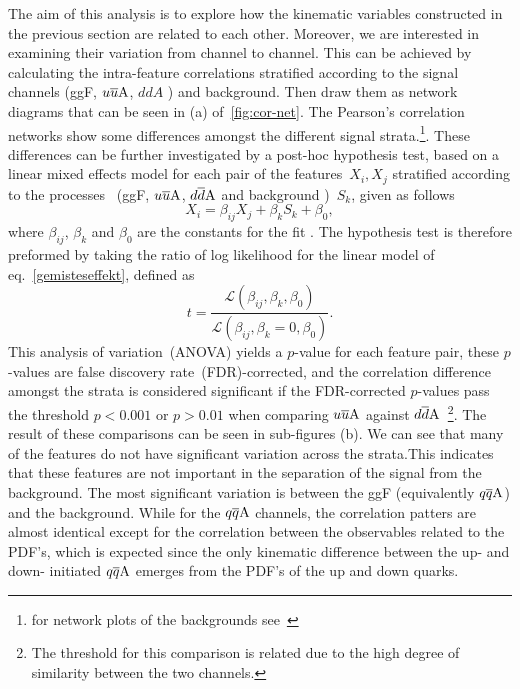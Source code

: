 The aim of this analysis is to explore how the kinematic variables constructed in the previous section are related to each other. Moreover, we are interested in examining their variation from channel to channel.  This can be achieved by calculating the intra-feature correlations stratified according to the signal channels (ggF, $u\overline u \rm A$, $ddA$ ) and background. Then draw them as network diagrams that can be seen in (a) of~\autoref{fig:cor-net}. The Pearson's correlation networks show some differences amongst the different signal strata.\footnote{for network plots of the backgrounds see~\cite{Grojean:2020ech}}. These differences can be further investigated by a post-hoc hypothesis test, based on a linear mixed effects model for each pair of the features~$X_i, X_j$ stratified according to the processes ~(ggF, $u\overline u \rm A$, $d\overline d \rm A$ and background )~$S_k$, given as follows
\begin{equation}
X_i = \beta_{ij} X_j + \beta_k S_k + \beta_0,
\label{gemisteseffekt}
\end{equation}
where $\beta_{ij}$, $\beta_k$ and $\beta_0$ are the constants for the fit . The hypothesis test is therefore preformed by taking  the ratio of log likelihood for the linear model of eq.~\eqref{gemisteseffekt}, defined as
\begin{equation}
	t = \frac{\mathscr{L} (\beta_{ij},\beta_k,\beta_0) }{\mathscr{L}(\beta_{ij},\beta_k=0,\beta_0)}.
\end{equation}
This analysis of variation~(ANOVA) yields a $p$-value for each feature pair, these $p$-values are false discovery rate~(FDR)-corrected, and the correlation difference amongst the strata is considered significant if the FDR-corrected $p$-values pass the threshold $ p<0.001$ or $p>0.01$ when comparing $u\overline u \rm A$ against $d\overline d \rm A$~\footnote{The threshold for this comparison is related due to the high degree of similarity between the two channels.}. The result of these comparisons can be seen in sub-figures (b). We can see that many of the features do not have significant variation across the strata.This indicates that these features are not important in the separation of the signal from the background. The most significant variation is between the ggF (equivalently $q\overline q \rm A$) and the background. While for the $q\overline q \rm A$ channels, the correlation patters are almost identical except for the correlation between the observables related to the PDF's, which is expected since the only kinematic difference between the up- and down- initiated $q\overline q \rm A$ emerges from the PDF's of the up and down quarks. \\
